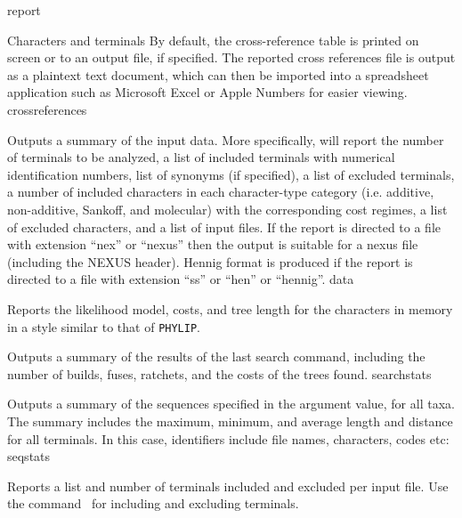 \begin{command}{report}{}
\begin{arguments}
\begin{argumentgroup}{Characters and terminals}
{                By default, the cross-reference table is printed on screen or to an
                output file, if specified. The reported cross references file is output 
                as a plaintext text document, which can then be imported into a 
                spreadsheet application such as Microsoft Excel or Apple Numbers 
                for easier viewing.}
                {crossreferences}

                {Outputs a summary of the input data.
                More specifically, \poy will report the number of
                terminals to be analyzed, a list of included terminals with
                numerical identification numbers, list
                of synonyms (if specified), a list of excluded terminals, a
                number of included characters in each character-type category
                (i.e. additive, non-additive, Sankoff, and molecular) with the corresponding
                cost regimes, a list of excluded
                characters, and a list of input files. If the report is directed
                to a file with extension ``nex'' or ``nexus'' then
                the output is suitable for a nexus file (including the NEXUS
                header). Hennig format is produced if the report is directed
                to a file with extension ``ss'' or ``hen'' or ``hennig''.}
                {data}

                {Reports the likelihood model, costs, and tree length for the
                characters in memory in a style similar  to that of \texttt{PHYLIP}.}
                {}

                {Outputs a summary of the results of the last search command,
                including the number of builds, fuses, ratchets, and the costs of
                the trees found.}
                {searchstats}

                {Outputs a summary of the sequences specified in the argument
                value, for all taxa. The summary includes the maximum, minimum,
                and average length and distance for all terminals.  In this case, identifiers
                include file names, characters, codes etc:}
                {seqstats}

                {Reports a list and number of terminals included and excluded
                per input file. Use the command~ for including and excluding
                terminals.}
                {}


\end{argumentgroup}
\end{arguments}
\end{command}
